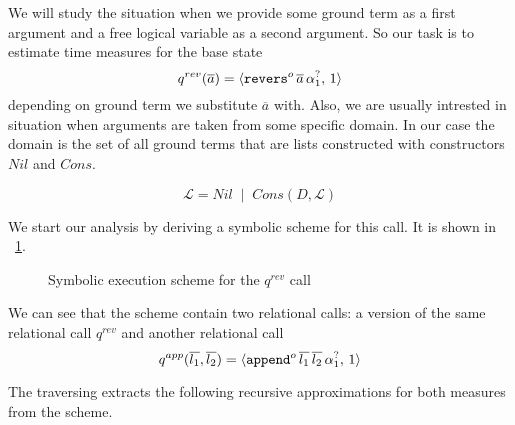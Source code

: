 We will study the situation when we provide some ground term as a first argument and a free logical variable as a second argument. So our task is to estimate time measures for the base state \[ q^{rev}(\overline{a}) = \langle \texttt{revers$^o$} \, \overline{a} \, \alpha_1^?  ,\, 1 \rangle \] depending on ground term we substitute $\overline{a}$ with. Also, we are usually intrested in situation when arguments are taken from some specific domain. In our case the domain is the set of all ground terms that are lists constructed with constructors $Nil$ and $Cons$.

\[ \mathcal{L} = Nil \; \mid \; Cons(D, \mathcal{L}) \]

We start our analysis by deriving a symbolic scheme for this call. It is shown in \figureword~\ref{fig:reverso_scheme}.

\begin{figure}[t]
\begin{center}
\end{center}

\caption{Symbolic execution scheme for the $q^{rev}$ call}
\label{fig:reverso_scheme}
\end{figure}


We can see that the scheme contain two relational calls: a version of the same relational call $q^{rev}$ and another relational call \[ q^{app}(\overline{l_1}, \overline{l_2}) = \langle \texttt{append$^o$} \, \overline{l_1} \, \overline{l_2} \, \alpha_1^?  ,\, 1 \rangle \]

The traversing extracts the following recursive approximations for both measures from the scheme.

